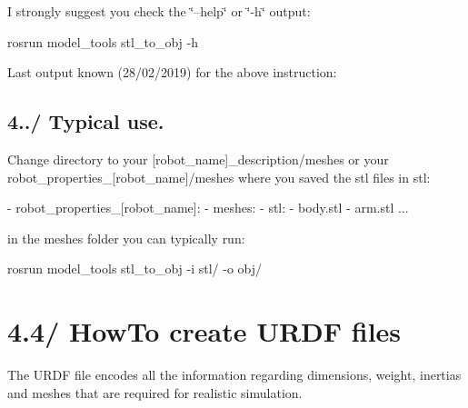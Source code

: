  I strongly suggest you check the \char`\"{}–help\char`\"{} or \char`\"{}-\/h\char`\"{} output\+: 
\begin{DoxyCode}
rosrun model\_tools stl\_to\_obj -h
\end{DoxyCode}
 Last output known (28/02/2019) for the above instruction\+: \hypertarget{subsubpage_stl_to_obj_stl_obj_sec_usage}{}\subsection{4../ Typical use.}\label{subsubpage_stl_to_obj_stl_obj_sec_usage}
Change directory to your \mbox{[}robot\+\_\+name\mbox{]}\+\_\+description/meshes or your robot\+\_\+properties\+\_\+\mbox{[}robot\+\_\+name\mbox{]}/meshes where you saved the stl files in stl\+: 
\begin{DoxyCode}
- robot\_properties\_[robot\_name]:
  - meshes:
  - stl:
    - body.stl
    - arm.stl
    ...
\end{DoxyCode}
 in the meshes folder you can typically run\+: 
\begin{DoxyCode}
rosrun model\_tools stl\_to\_obj -i stl/ -o obj/
\end{DoxyCode}
 \hypertarget{subsubpage_urdf}{}\section{4.4/ How\+To create U\+R\+DF files}\label{subsubpage_urdf}
The U\+R\+DF file encodes all the information regarding dimensions, weight, inertias and meshes that are required for realistic simulation.

